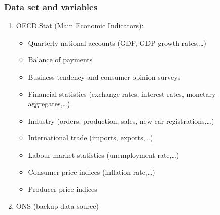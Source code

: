 \begin{frame}
    \frametitle{Data set and variables}
    \begin{enumerate}
        \item OECD.Stat (Main Economic Indicators):
            \begin{itemize}
                \item Quarterly national accounts (GDP, GDP growth rates,…)
                \item Balance of payments
                \item Business tendency and consumer opinion surveys
                \item Financial statistics (exchange rates, interest rates, monetary aggregates,…)
                \item Industry (orders, production, sales, new car registrations,…)
                \item International trade (imports, exports,…)
                \item Labour market statistics (unemployment rate,…)
                \item Consumer price indices (inflation rate,…)
                \item Producer price indices
            \end{itemize}
        \item ONS (backup data source)
    \end{enumerate}
\end{frame}